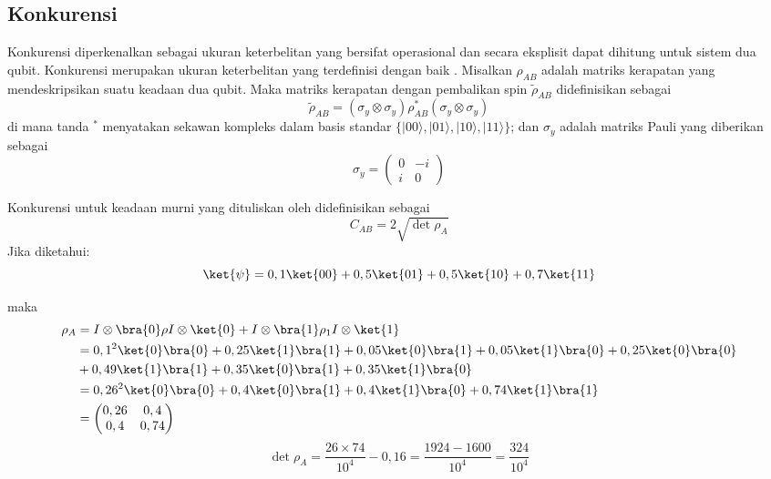 \subsection{Konkurensi}
\par
Konkurensi diperkenalkan sebagai ukuran keterbelitan yang bersifat operasional dan secara eksplisit dapat dihitung untuk sistem dua qubit. Konkurensi merupakan ukuran keterbelitan yang terdefinisi dengan baik \cite{Wootters1998}. Misalkan $\rho_{AB}$ adalah matriks kerapatan yang mendeskripsikan suatu keadaan dua qubit. Maka matriks kerapatan dengan pembalikan spin $\tilde{\rho}_{AB}$ didefinisikan sebagai
\begin{equation}
	\tilde{\rho}_{AB} = (\sigma_y \otimes \sigma_y)\rho_{AB}^*(\sigma_y \otimes \sigma_y) \label{rhotilde}
\end{equation}
di mana tanda $^*$ menyatakan sekawan kompleks dalam basis standar $\{|00\rangle, |01\rangle, |10\rangle, |11\rangle\}$; dan $\sigma_y$ adalah matriks Pauli yang diberikan sebagai
\begin{equation}
	\sigma_y =
	\begin{pmatrix}
		0 & -i \\
		i & 0
	\end{pmatrix}
\end{equation}

Konkurensi untuk keadaan murni yang dituliskan oleh \cite{coffman2000distributed} didefinisikan sebagai
\begin{equation}
	C_{AB}=2\sqrt{\det\rho_{A}}
\end{equation}
Jika diketahui:
\begin{equation}
	\ket{\psi}=0,1\ket{00}+0,5\ket{01}+0,5\ket{10}+0,7\ket{11}
\end{equation}

maka
\begin{equation}
	\begin{aligned}
		\rho_A
		&=I\otimes\bra{0}\rho I\otimes\ket{0} +I\otimes\bra{1}\rho_1I\otimes\ket{1}\\
		&=0,1^2\ket{0}\bra{0}+0,25\ket{1}\bra{1}+0,05\ket{0}\bra{1}+0,05\ket{1}\bra{0}+0,25\ket{0}\bra{0}\\
		&+0,49\ket{1}\bra{1}+0,35\ket{0}\bra{1}+0,35\ket{1}\bra{0}\\
		&=0,26^2\ket{0}\bra{0}+0,4\ket{0}\bra{1}+0,4\ket{1}\bra{0}+0,74\ket{1}\bra{1}\\
		&=
		\begin{pmatrix}
			0,26&0,4\\
			0,4&0,74
		\end{pmatrix}
	\end{aligned}
\end{equation}
\begin{equation}
	\det\rho_{A}=\frac{26\times74}{10^4}-0,16=\frac{1924-1600}{10^4}=\frac{324}{10^4}
\end{equation}

